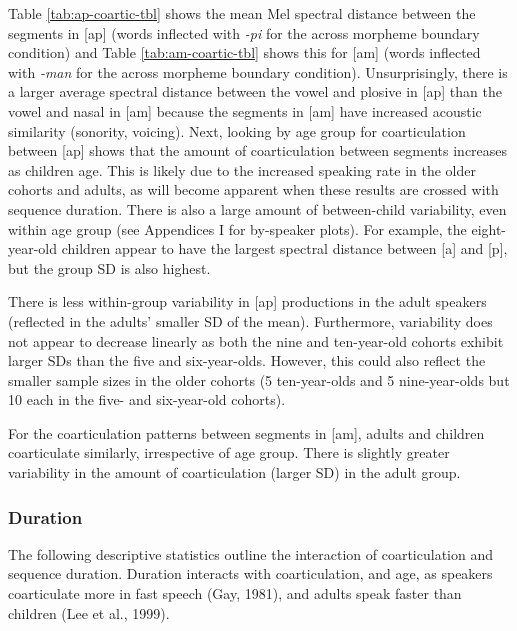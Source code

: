 \documentclass[
]{article}
\begin{document}
Table \ref{tab:ap-coartic-tbl} shows the mean Mel spectral distance between the segments in {[}ap{]} (words inflected with \emph{-pi} for the across morpheme boundary condition) and Table \ref{tab:am-coartic-tbl} shows this for {[}am{]} (words inflected with \emph{-man} for the across morpheme boundary condition). Unsurprisingly, there is a larger average spectral distance between the vowel and plosive in {[}ap{]} than the vowel and nasal in {[}am{]} because the segments in {[}am{]} have increased acoustic similarity (sonority, voicing). Next, looking by age group for coarticulation between {[}ap{]} shows that the amount of coarticulation between segments increases as children age. This is likely due to the increased speaking rate in the older cohorts and adults, as will become apparent when these results are crossed with sequence duration. There is also a large amount of between-child variability, even within age group (see Appendices I for by-speaker plots). For example, the eight-year-old children appear to have the largest spectral distance between {[}a{]} and {[}p{]}, but the group SD is also highest.

There is less within-group variability in {[}ap{]} productions in the adult speakers (reflected in the adults' smaller SD of the mean). Furthermore, variability does not appear to decrease linearly as both the nine and ten-year-old cohorts exhibit larger SDs than the five and six-year-olds. However, this could also reflect the smaller sample sizes in the older cohorts (5 ten-year-olds and 5 nine-year-olds but 10 each in the five- and six-year-old cohorts).

For the coarticulation patterns between segments in {[}am{]}, adults and children coarticulate similarly, irrespective of age group. There is slightly greater variability in the amount of coarticulation (larger SD) in the adult group.

\hypertarget{duration}{%
\subsubsection{Duration}\label{duration}}

The following descriptive statistics outline the interaction of coarticulation and sequence duration. Duration interacts with coarticulation, and age, as speakers coarticulate more in fast speech (Gay, 1981), and adults speak faster than children (Lee et al., 1999).
\end{document}
